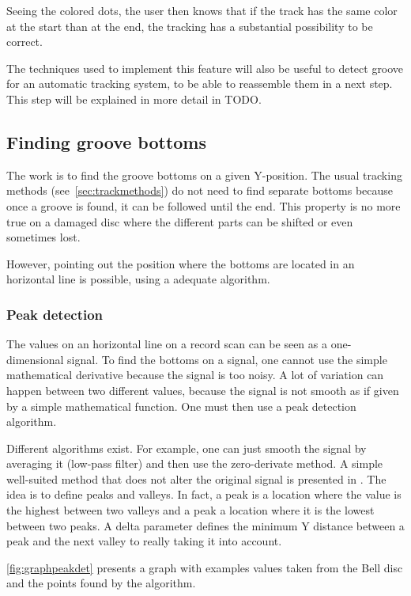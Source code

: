 Seeing the colored dots, the user then knows that if the track has the same color at the start than at the end, the tracking has a substantial possibility to be correct.

The techniques used to implement this feature will also be useful to detect groove for an automatic tracking system, to be able to reassemble them in a next step. This step will be explained in more detail in TODO. %

\subsection{Finding groove bottoms}

The work is to find the groove bottoms on a given Y-position. The usual tracking methods (see~\autoref{sec:trackmethods}) do not need to find separate bottoms because once a groove is found, it can be followed until the end. This property is no more true on a damaged disc where the different parts can be shifted or even sometimes lost.

However, pointing out the position where the bottoms are located in an horizontal line is possible, using a adequate algorithm.

\subsubsection{Peak detection}

The values on an horizontal line on a record scan can be seen as a one-dimensional signal. To find the bottoms on a signal, one cannot use the simple mathematical derivative because the signal is too noisy. A lot of variation can happen between two different values, because the signal is not smooth as if given by a simple mathematical function. One must then use a peak detection algorithm.

Different algorithms exist. For example, one can just smooth the signal by averaging it (low-pass filter) and then use the zero-derivate method. A simple well-suited method that does not alter the original signal is presented in \cite{peak12}. The idea is to define peaks and valleys. In fact, a peak is a location where the value is the highest between two valleys and a peak a location where it is the lowest between two peaks. A delta parameter defines the minimum Y distance between a peak and the next valley to really taking it into account.

\autoref{fig:graphpeakdet} presents a graph with examples values taken from the Bell disc and the points found by the algorithm.

